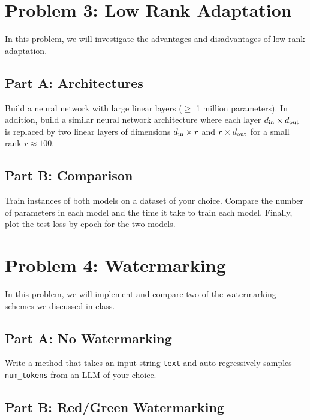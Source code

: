 \documentclass{article}
\begin{document}
%

\newpage
\section*{Problem 3: Low Rank Adaptation}

In this problem, we will investigate the advantages and disadvantages of low rank adaptation.

\subsection*{Part A: Architectures}

Build a neural network with large linear layers ($\geq$ 1 million parameters).
In addition, build a similar neural network architecture where each layer $d_\textnormal{in} \times d_\textnormal{out}$ is replaced by two linear layers of dimensions $d_\textnormal{in} \times r$ and $r \times d_\textnormal{out}$ for a small rank $r \approx 100$.

\subsection*{Part B: Comparison}

Train instances of both models on a dataset of your choice.
Compare the number of parameters in each model and the time it take to train each model.
Finally, plot the test loss by epoch for the two models.

%

\newpage
\section*{Problem 4: Watermarking}

In this problem, we will implement and compare two of the watermarking schemes we discussed in class.

\subsection*{Part A: No Watermarking}

Write a method that takes an input string \texttt{text} and auto-regressively samples \texttt{num\_tokens} from an LLM of your choice.

\subsection*{Part B: Red/Green Watermarking}
\end{document}
